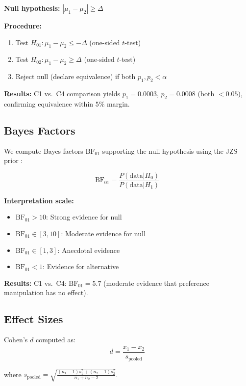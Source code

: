 \documentclass{article}
\theoremstyle{plain}
\theoremstyle{definition}
\theoremstyle{remark}
\begin{document}
\textbf{Null hypothesis:} $|\mu_1 - \mu_2| \geq \Delta$

\textbf{Procedure:}
\begin{enumerate}
\item Test $H_{01}: \mu_1 - \mu_2 \leq -\Delta$ (one-sided $t$-test)
\item Test $H_{02}: \mu_1 - \mu_2 \geq \Delta$ (one-sided $t$-test)
\item Reject null (declare equivalence) if both $p_1, p_2 < \alpha$
\end{enumerate}

\textbf{Results:} C1 vs.\ C4 comparison yields $p_1 = 0.0003$, $p_2 = 0.0008$ (both $< 0.05$), confirming equivalence within 5\% margin.

\subsection{Bayes Factors}

We compute Bayes factors $\text{BF}_{01}$ supporting the null hypothesis using the JZS prior \citep{rouder2009bayesian}:

\begin{equation}
\text{BF}_{01} = \frac{P(\text{data} | H_0)}{P(\text{data} | H_1)}
\end{equation}

\textbf{Interpretation scale:}
\begin{itemize}
\item $\text{BF}_{01} > 10$: Strong evidence for null
\item $\text{BF}_{01} \in [3, 10]$: Moderate evidence for null
\item $\text{BF}_{01} \in [1, 3]$: Anecdotal evidence
\item $\text{BF}_{01} < 1$: Evidence for alternative
\end{itemize}

\textbf{Results:} C1 vs.\ C4: $\text{BF}_{01} = 5.7$ (moderate evidence that preference manipulation has no effect).

\subsection{Effect Sizes}

Cohen's $d$ computed as:
\begin{equation}
d = \frac{\bar{x}_1 - \bar{x}_2}{s_\text{pooled}}
\end{equation}

where $s_\text{pooled} = \sqrt{\frac{(n_1-1)s_1^2 + (n_2-1)s_2^2}{n_1+n_2-2}}$.
\end{document}

